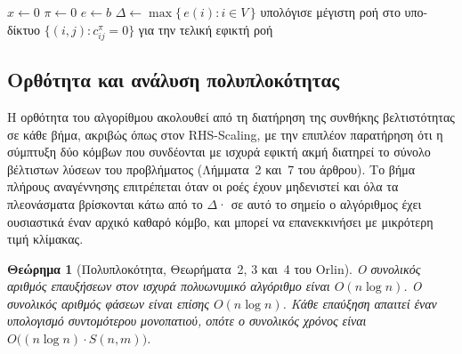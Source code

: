 \documentclass[11pt,a4paper,oneside]{report}
\newtheorem{theorem}{Θεώρημα}[chapter]
\let\oldsubsection\subsection
\renewcommand{\subsection}{\FloatBarrier\oldsubsection}
\begin{document}
\begin{algorithm}[H]
\caption{\textenglish{Strongly-Polynomial} (Εικόνα~5 του άρθρου του \textenglish{Orlin})}
$x \leftarrow 0$\;
$\pi \leftarrow 0$\;
$e \leftarrow b$\;
$\Delta \leftarrow \max\{\,e(i) : i \in V\,\}$\;
υπολόγισε μέγιστη ροή στο υπο-δίκτυο $\{(i,j) : c^{\pi}_{ij} = 0\}$ για την τελική εφικτή ροή\;
\end{algorithm}

\subsection{Ορθότητα και ανάλυση πολυπλοκότητας}

Η ορθότητα του αλγορίθμου ακολουθεί από τη διατήρηση της συνθήκης βελτιστότητας σε κάθε βήμα, ακριβώς όπως στον \textenglish{RHS-Scaling}, με την επιπλέον παρατήρηση ότι η σύμπτυξη δύο κόμβων που συνδέονται με ισχυρά εφικτή ακμή διατηρεί το σύνολο βέλτιστων λύσεων του προβλήματος (Λήμματα~2 και~7 του άρθρου). Το βήμα πλήρους αναγέννησης επιτρέπεται όταν οι ροές έχουν μηδενιστεί και όλα τα πλεονάσματα βρίσκονται κάτω από το $\Delta$· σε αυτό το σημείο ο αλγόριθμος έχει ουσιαστικά έναν αρχικό καθαρό κόμβο, και μπορεί να επανεκκινήσει με μικρότερη τιμή κλίμακας.

\begin{theorem}[Πολυπλοκότητα, Θεωρήματα~2, 3 και~4 του \textenglish{Orlin}]
Ο συνολικός αριθμός επαυξήσεων στον ισχυρά πολυωνυμικό αλγόριθμο είναι $O(n \log n)$. Ο συνολικός αριθμός φάσεων είναι επίσης $O(n \log n)$. Κάθε επαύξηση απαιτεί έναν υπολογισμό συντομότερου μονοπατιού, οπότε ο συνολικός χρόνος είναι $O\bigl((n \log n) \cdot S(n,m)\bigr)$.
\end{theorem}
\end{document}
